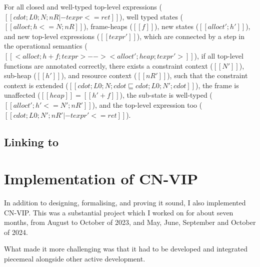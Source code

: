 \begin{theorem}
For all closed and well-typed top-level expressions
($[[ cdot ; L0 ; N ; nR |- texpr <= ret ]]$),
well typed states ($[[ alloct ; h <= N ; nR ]]$),
frame-heaps ($[[ f ]]$),
new states ($[[ alloct' ; h' ]]$),
and new top-level expressions ($[[ texpr' ]]$),
which are connected by a step in the operational semantics
($[[ < alloct ; h + f ; texpr > -->  < alloct' ; heap ; texpr' > ]]$),
if all top-level functions are annotated correctly,
there exists a constraint context ($[[ N' ]]$),
sub-heap ($[[ h' ]]$),
and resource context ($[[ nR' ]]$),
such that the constraint context is extended
($[[ cdot ; L0 ; N ; cdot \sqsubseteq cdot ; L0 ; N' ; cdot ]]$),
the frame is unaffected ($[[ heap ]] = [[ h' + f ]]$),
the sub-state is well-typed ($[[ alloct' ; h' <= N' ; nR' ]]$),
and the top-level expression too
($[[ cdot ; L0 ; N' ; nR' |- texpr' <= ret ]]$).
\end{theorem}

\section{Linking  to }\label{sec:linking}

\chapter{Implementation of CN-VIP}

\margintoc{}

In addition to designing, formalising, and proving it sound, I also implemented
CN-VIP\@. This was a substantial project which I worked on for about seven
months, from August to October of 2023, and May, June, September and October
of 2024.

What made it more challenging was that it had to be developed and integrated
piecemeal alongside other active  development.

